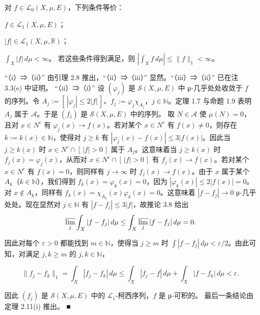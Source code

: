 \begin{theorem}

对 $ f \in \mathcal{L}_0(X,\mu,E) $，下列条件等价：

\begin{subitems}
\item

$ f \in \mathcal{L}_1(X,\mu,E) $；

\item

$ |f| \in \mathcal{L}_1(X,\mu,\mathbb{R}) $；

\item

$ \int_X |f|\,d\mu < \infty $。
若这些条件得到满足，则 $ \left| \int_X f\,d\mu \right| \le \|f\|_1 < \infty $。

\proofhead
“（i）⇒（ii）” 由引理 2.8 推出，“（ii）⇒（iii）” 显然。“（iii）⇒（ii）” 已在注 3.3(e) 中证明。
“（ii）⇒（i）” 设 $ (\varphi_j) $ 是 $ \mathcal{S}(X,\mu,E) $ 中 μ-几乎处处收敛于 $ f $ 的序列。令 $ A_j := [\,|\varphi_j| \le 2|f|\,] $、$ f_j := \varphi_j\chi_{A_j} $，$ j \in \mathbb{N} $。定理 1.7 与命题 1.9 表明 $ A_j $ 属于 $ \mathcal{A} $。于是 $ (f_j) $ 是 $ \mathcal{S}(X,\mu,E) $ 中的序列。
取 $ N \in \mathcal{A} $ 使 $ \mu(N) = 0 $，且对 $ x \in N^c $ 有 $ \varphi_j(x) \to f(x) $。若对某个 $ x \in N^c $ 有 $ f(x) \ne 0 $，则存在 $ k := k(x) \in \mathbb{N} $，使得对 $ j \ge k $ 有 $ |\varphi_j(x) - f(x)| \le 3|f(x)| $。因此当 $ j \ge k(x) $ 时 $ x \in N^c \cap [\,|f| > 0\,] $ 属于 $ A_j $。这意味着当 $ j \ge k(x) $ 时 $ f_j(x) = \varphi_j(x) $，从而对 $ x \in N^c \cap [\,|f| > 0\,] $ 有 $ f_j(x) \to f(x) $。若对某个 $ x \in N^c $ 有 $ f(x) = 0 $，则同样有 $ j \to \infty $ 时 $ f_j(x) \to f(x) $。由于 $ x $ 属于某个 $ A_k $（$ k \in \mathbb{N} $），我们得到 $ f_k(x) = \varphi_k(x) = 0 $，因为 $ |\varphi_k(x)| \le 2|f(x)| = 0 $。对 $ x \notin A_k $，同样有 $ f_k(x) = \chi_{A_k}(x)\varphi_k(x) = 0 $。这意味着 $ |f - f_j| \to 0 $ μ-几乎处处。现在显然对 $ j \in \mathbb{N} $ 有 $ |f - f_j| \le 3|f| $，故推论 3.8 给出
\[
\varlimsup_j \int_X |f - f_j|\,d\mu \le \int_X \varlimsup_j |f - f_j|\,d\mu = 0 .
\]

因此对每个 $ \varepsilon > 0 $ 都能找到 $ m \in \mathbb{N} $，使得当 $ j \ge m $ 时 $ \int |f - f_j|\,d\mu < \varepsilon/2 $。由此可知，对满足 $ j, k \ge m $ 的 $ j, k \in \mathbb{N} $，

\[
\|f_j - f_k\|_1 = \int_X |f_j - f_k|\,d\mu \le \int_X |f_j - f|\,d\mu + \int_X |f - f_k|\,d\mu < \varepsilon .
\]

因此 $ (f_j) $ 是 $ \mathcal{S}(X,\mu,E) $ 中的 $ \mathcal{L}_1 $-柯西序列，$ f $ 是 μ-可积的。
最后一条结论由定理 2.11(i) 推出。 \nobreak\hspace{0.35em}■

\end{subitems}

\end{theorem}

